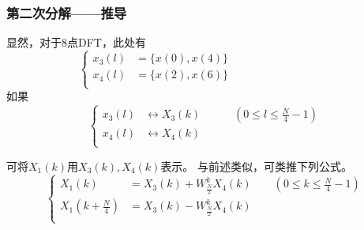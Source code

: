 \documentclass[notheorems,compress,mathserif,table]{beamer}
\begin{document}
\begin{frame}[shrink]\frametitle{第二次分解——推导}
显然，对于8点DFT，此处有
$$ \label{eq:2}
\left\{ \begin{aligned}
    x_3(l) &= \{x(0),x(4)\}\quad\quad\quad\quad\quad\quad\quad\quad\quad\\
    x_4(l) &= \{x(2),x(6)\}\\
\end{aligned} \right.
$$
如果
$$
\left\{ \begin{aligned}
    x_3(l) &\longleftrightarrow X_3(k)\quad\quad\quad(0\leq l\leq\frac{N}{4}-1)\\
    x_4(l) &\longleftrightarrow X_4(k)\\
\end{aligned} \right.
$$
\par 可将$X_1(k)$用$X_3(k),X_4(k)$表示。\newline
与前述类似，可类推下列公式。
$$
\left\{ \begin{aligned}
     X_1(k)\quad      &=  X_{3}(k) + W_{\frac{N}{2}}^{k}X_{4}(k)   \quad\quad(0\leq k\leq\frac{N}{4}-1)\\
    X_1(k+\frac{N}{4}) &=  X_{3}(k) - W_{\frac{N}{2}}^{k}X_{4}(k)\\
\end{aligned} \right.
$$
\end{frame}
\end{document}
